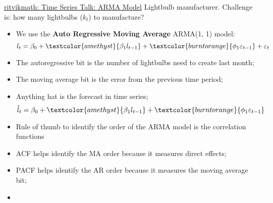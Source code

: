 \documentclass[12pt, titlepage, french]{report}
\begin{document}
\begin{YTB_SUMM}{\href{https://www.youtube.com/watch?v=HhvTlaN06AM&list=PLvcbYUQ5t0UHOLnBzl46_Q6QKtFgfMGc3&index=8}{ritvikmath: Time Series Talk: ARMA Model}}
Lightbulb manufacturer. Challenge is: how many lightbulbs ($k_{t}$) to manufacture?
\begin{itemize}
	\item	We use the \textbf{Auto Regressive Moving Average} \textcolor{amethyst}{AR}\textcolor{burntorange}{MA}(1, 1) model: 
	\begin{equation*}
		l_{t} = \beta_{0} + \textcolor{amethyst}{\beta_{1} l_{t - 1}} + \textcolor{burntorange}{\phi_{1} \varepsilon_{t - 1}} + \varepsilon_{t}
	\end{equation*}
	\item[]	The \textcolor{amethyst}{autoregressive bit} is the number of lightbulbs need to create last month;
	\item[]	The \textcolor{burntorange}{moving average bit} is the error from the previous time period;
	\item	Anything \og hat \fg{} is the forecast in time series;
	\begin{equation*}
		\hat{l}_{t} = \beta_{0} + \textcolor{amethyst}{\beta_{1} l_{t - 1}} + \textcolor{burntorange}{\phi_{1} \varepsilon_{t - 1}}
	\end{equation*}
	\item	Rule of thumb to identify the order of the ARMA model is the correlation functions
	\item[]	ACF helps identify the MA order because it measures direct effects;
	\item[]	PACF helps identify the AR order because it measures the moving average bit;
	\item	
\end{itemize}
\end{YTB_SUMM}
\end{document}
